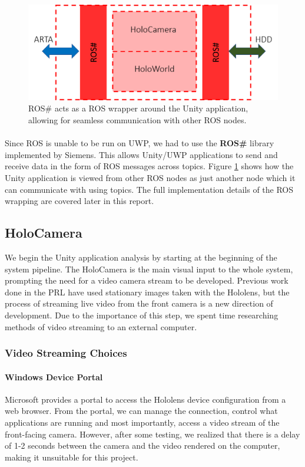 \begin{figure}[ht!]
	\centering
	\includegraphics[width=0.8\linewidth]{img/chapter4_analysis/holoROSSharpWrapper.png}
	\caption{ROS\# acts as a ROS wrapper around the Unity application, allowing for seamless communication with other ROS nodes.}
	\label{fig:holoROSWrapper}
	\vspace{-1\baselineskip}
\end{figure}

\paragraph{} Since ROS is unable to be run on UWP, we had to use the \textbf{ROS\#} library implemented by Siemens. This allows Unity/UWP applications to send and receive data in the form of ROS messages across topics. Figure \ref{fig:holoROSWrapper} shows how the Unity application is viewed from other ROS nodes as just another node which it can communicate with using topics. The full implementation details of the ROS wrapping are covered later in this report. 

\subsection{HoloCamera}
We begin the Unity application analysis by starting at the beginning of the system pipeline. The HoloCamera is the main visual input to the whole system, prompting the need for a video camera stream to be developed. Previous work done in the PRL have used stationary images taken with the Hololens, but the process of streaming live video from the front camera is a new direction of development. Due to the importance of this step, we spent time researching methods of video streaming to an external computer.

\subsubsection{Video Streaming Choices} \label{sec:videoStreaming}

\paragraph{Windows Device Portal} Microsoft provides a portal to access the Hololens device configuration from a web browser. From the portal, we can manage the connection, control what applications are running and most importantly, access a video stream of the front-facing camera. However, after some testing, we realized that there is a delay of 1-2 seconds between the camera and the video rendered on the computer, making it unsuitable for this project.

